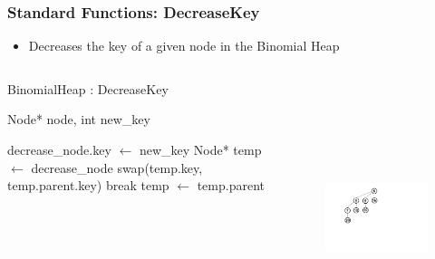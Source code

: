\documentclass[13pt]{beamer}
\begin{document}
\begin{frame}
\frametitle{Standard Functions: DecreaseKey}
  \begin{itemize}
    \item Decreases the key of a given node in the Binomial Heap
  \end{itemize}

  \begin{columns}[T] %
    \begin{column}[T]{6cm} %
        \begin{algorithm}[H]
        \small
        \caption{BinomialHeap : DecreaseKey}
        \begin{algorithmic}
          \REQUIRE Node* node, int new\_key

          \STATE decrease\_node.key $\leftarrow$ new\_key
          \STATE Node* temp $\leftarrow$ decrease\_node
                \STATE swap(temp.key, temp.parent.key)
              \ELSE
                \STATE break
              \ENDIF
              \STATE temp $\leftarrow$ temp.parent
          \ENDWHILE
        \end{algorithmic}
        \end{algorithm}
    \end{column}
    \begin{column}[T]{7cm} %
      \begin{figure}
        \includegraphics[height=8cm]{./img/decreasekeyA.png}
      \end{figure}
    \end{column}
  \end{columns}

\end{frame}
\end{document}
